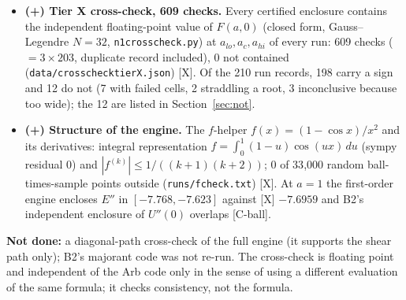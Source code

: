 \documentclass[10pt]{article}
\newcommand{\tier}[1]{\textsf{[#1]}}
\newcommand{\tX}{\tier{X}}
\newcommand{\tCb}{\textcolor{blue!60!black}{\textsf{[C-ball]}}}
\renewcommand{\_}{\textunderscore\penalty0\hspace{0pt}}
\begin{document}
\begin{itemize}
\item \textbf{(+) Tier X cross-check, 609 checks.} Every certified enclosure contains the independent floating-point value of $F(a,0)$ (closed form, Gauss--Legendre $N=32$, \texttt{n1\_crosscheck.py}) at $a_{lo},a_c,a_{hi}$ of every run: 609 checks ($=3\times203$, duplicate record included), 0 not contained (\texttt{data/crosscheck\_tierX.json}) \tX. Of the 210 run records, 198 carry a sign and 12 do not (7 with failed cells, 2 straddling a root, 3 inconclusive because too wide); the 12 are listed in Section~\ref{sec:not}.
\item \textbf{(+) Structure of the engine.} The $f$-helper $f(x)=(1-\cos x)/x^2$ and its derivatives: integral representation $f=\int_0^1(1-u)\cos(ux)\,du$ (sympy residual 0) and $|f^{(k)}|\le1/((k+1)(k+2))$; 0 of 33{,}000 random ball-times-sample points outside (\texttt{runs/fcheck.txt}) \tX. At $a=1$ the first-order engine encloses $E''$ in $[-7.768,-7.623]$ against \tX{} $-7.6959$ and B2's independent enclosure of $U''(0)$ overlaps \tCb.
\end{itemize}
\textbf{Not done:} a diagonal-path cross-check of the full engine (it supports the shear path only); B2's majorant code was not re-run. The cross-check is floating point and independent of the Arb code only in the sense of using a different evaluation of the same formula; it checks consistency, not the formula.

\end{document}
